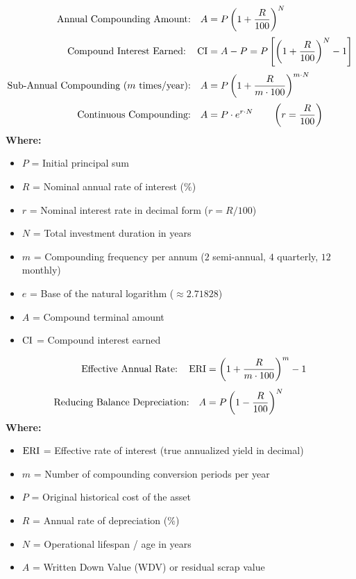\begin{formulabox}
\begin{align*}
    \text{Annual Compounding Amount:} \quad A &= P \left(1 + \frac{R}{100}\right)^N \\[2pt]
    \text{Compound Interest Earned:} \quad \operatorname{CI} &= A - P = P \left[\left(1 + \frac{R}{100}\right)^N - 1\right] \\[2pt]
    \text{Sub-Annual Compounding ($m$ times/year):} \quad A &= P \left(1 + \frac{R}{m \cdot 100}\right)^{m \cdot N} \\[2pt]
    \text{Continuous Compounding:} \quad A &= P \cdot e^{r \cdot N} \qquad \left(r = \frac{R}{100}\right)
\end{align*}
\textbf{Where:}
\begin{itemize}[noitemsep, topsep=1pt]
    \item $P$ = Initial principal sum
    \item $R$ = Nominal annual rate of interest ($\%$)
    \item $r$ = Nominal interest rate in decimal form ($r = R/100$)
    \item $N$ = Total investment duration in years
    \item $m$ = Compounding frequency per annum ($2$ semi-annual, $4$ quarterly, $12$ monthly)
    \item $e$ = Base of the natural logarithm ($\approx 2.71828$)
    \item $A$ = Compound terminal amount
    \item $\operatorname{CI}$ = Compound interest earned
\end{itemize}
\end{formulabox}

\begin{formulabox}
\begin{align*}
    \text{Effective Annual Rate:} \quad \operatorname{ERI} &= \left(1 + \frac{R}{m \cdot 100}\right)^m - 1 \\[4pt]
    \text{Reducing Balance Depreciation:} \quad A &= P \left(1 - \frac{R}{100}\right)^N
\end{align*}
\textbf{Where:}
\begin{itemize}[noitemsep, topsep=2pt]
    \item $\operatorname{ERI}$ = Effective rate of interest (true annualized yield in decimal)
    \item $m$ = Number of compounding conversion periods per year
    \item $P$ = Original historical cost of the asset
    \item $R$ = Annual rate of depreciation ($\%$)
    \item $N$ = Operational lifespan / age in years
    \item $A$ = Written Down Value (WDV) or residual scrap value
\end{itemize}
\end{formulabox}

